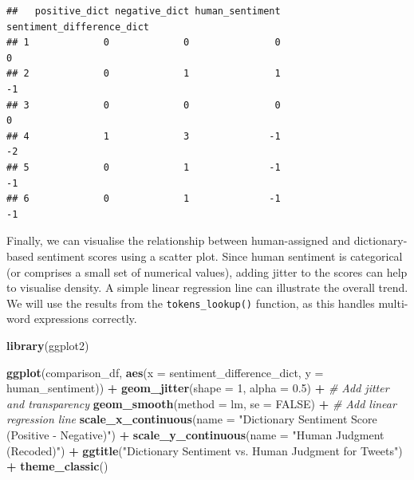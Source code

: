 \documentclass[
]{book}
\newenvironment{Shaded}{\begin{snugshade}}{\end{snugshade}}
\newcommand{\AttributeTok}[1]{\textcolor[rgb]{0.13,0.29,0.53}{#1}}
\newcommand{\CommentTok}[1]{\textcolor[rgb]{0.56,0.35,0.01}{\textit{#1}}}
\newcommand{\ConstantTok}[1]{\textcolor[rgb]{0.56,0.35,0.01}{#1}}
\newcommand{\DecValTok}[1]{\textcolor[rgb]{0.00,0.00,0.81}{#1}}
\newcommand{\FloatTok}[1]{\textcolor[rgb]{0.00,0.00,0.81}{#1}}
\newcommand{\FunctionTok}[1]{\textcolor[rgb]{0.13,0.29,0.53}{\textbf{#1}}}
\newcommand{\NormalTok}[1]{#1}
\newcommand{\SpecialCharTok}[1]{\textcolor[rgb]{0.81,0.36,0.00}{\textbf{#1}}}
\newcommand{\StringTok}[1]{\textcolor[rgb]{0.31,0.60,0.02}{#1}}
\begin{document}
\begin{verbatim}
##   positive_dict negative_dict human_sentiment sentiment_difference_dict
## 1             0             0               0                         0
## 2             0             1               1                        -1
## 3             0             0               0                         0
## 4             1             3              -1                        -2
## 5             0             1              -1                        -1
## 6             0             1              -1                        -1
\end{verbatim}

Finally, we can visualise the relationship between human-assigned and dictionary-based sentiment scores using a scatter plot. Since human sentiment is categorical (or comprises a small set of numerical values), adding jitter to the scores can help to visualise density. A simple linear regression line can illustrate the overall trend. We will use the results from the \texttt{tokens\_lookup()} function, as this handles multi-word expressions correctly.

\begin{Shaded}
\begin{Highlighting}[]
\FunctionTok{library}\NormalTok{(ggplot2)}

\FunctionTok{ggplot}\NormalTok{(comparison\_df,}
       \FunctionTok{aes}\NormalTok{(}\AttributeTok{x =}\NormalTok{ sentiment\_difference\_dict, }\AttributeTok{y =}\NormalTok{ human\_sentiment)) }\SpecialCharTok{+}
  \FunctionTok{geom\_jitter}\NormalTok{(}\AttributeTok{shape =} \DecValTok{1}\NormalTok{, }\AttributeTok{alpha =} \FloatTok{0.5}\NormalTok{) }\SpecialCharTok{+} \CommentTok{\# Add jitter and transparency}
  \FunctionTok{geom\_smooth}\NormalTok{(}\AttributeTok{method =}\NormalTok{ lm, }\AttributeTok{se =} \ConstantTok{FALSE}\NormalTok{) }\SpecialCharTok{+} \CommentTok{\# Add linear regression line}
  \FunctionTok{scale\_x\_continuous}\NormalTok{(}\AttributeTok{name =} \StringTok{"Dictionary Sentiment Score (Positive {-} Negative)"}\NormalTok{) }\SpecialCharTok{+}
  \FunctionTok{scale\_y\_continuous}\NormalTok{(}\AttributeTok{name =} \StringTok{"Human Judgment (Recoded)"}\NormalTok{) }\SpecialCharTok{+}
  \FunctionTok{ggtitle}\NormalTok{(}\StringTok{"Dictionary Sentiment vs. Human Judgment for Tweets"}\NormalTok{) }\SpecialCharTok{+}
  \FunctionTok{theme\_classic}\NormalTok{()}
\end{Highlighting}
\end{Shaded}
\end{document}
